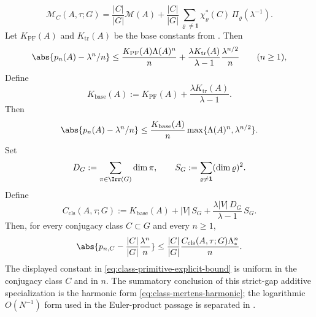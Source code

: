 \begin{theorem}
\begin{equation}
    \mathcal M_C(A,\tau;G)
    =
    \frac{|C|}{|G|}\mathcal M(A)
    +\frac{|C|}{|G|}
      \sum_{\varrho\neq\mathbf 1}
        \chi_\varrho^\ast(C)\,\Pi_\varrho(\lambda^{-1}).
  \end{equation}
  Let \(K_{\mathrm{PF}}(A)\) and \(K_{\mathrm{tr}}(A)\) be the base
  constants from . Then
  \begin{equation}\label{eq:class-mertens-base-constant}
    \abs{p_n(A)-\lambda^n/n}
    \le
    \frac{K_{\mathrm{PF}}(A)\Lambda(A)^n}{n}
    +\frac{\lambda K_{\mathrm{tr}}(A)}{\lambda-1}
      \frac{\lambda^{n/2}}{n}
    \qquad (n\ge 1),
  \end{equation}
  Define
  \[
    K_{\mathrm{base}}(A)
    :=
    K_{\mathrm{PF}}(A)
    +\frac{\lambda K_{\mathrm{tr}}(A)}{\lambda-1}.
  \]
  Then
  \[
    \abs{p_n(A)-\lambda^n/n}
    \le
    \frac{K_{\mathrm{base}}(A)}{n}
      \max\{\Lambda(A)^n,\lambda^{n/2}\}.
  \]
  Set
  \[
    D_G:=\sum_{\pi\in\Irr(G)}\dim\pi,
    \qquad
    S_G:=\sum_{\varrho\neq\mathbf 1}(\dim\varrho)^2.
  \]
  Define
  \begin{equation}\label{eq:class-mertens-explicit-constant}
    C_{\mathrm{cls}}(A,\tau;G)
    :=
    K_{\mathrm{base}}(A)
    +|V|\,S_G
    +\frac{\lambda |V|\,D_G}{\lambda-1}\,S_G.
  \end{equation}
  Then, for every conjugacy class \(C\subset G\) and every \(n\ge 1\),
  \begin{equation}\label{eq:class-primitive-explicit-bound}
    \abs{
      p_{n,C}
      -\frac{|C|}{|G|}\frac{\lambda^n}{n}
    }
    \le
    \frac{|C|}{|G|}
    \frac{C_{\mathrm{cls}}(A,\tau;G)\Lambda_*^n}{n}.
  \end{equation}
  The displayed constant in
  \eqref{eq:class-primitive-explicit-bound} is uniform in the conjugacy
  class \(C\) and in \(n\).  The summatory conclusion of this strict-gap
  additive specialization is the harmonic form
  \eqref{eq:class-mertens-harmonic}; the logarithmic \(O(N^{-1})\)
  form used in the Euler-product passage is separated in
  .
\end{theorem}

